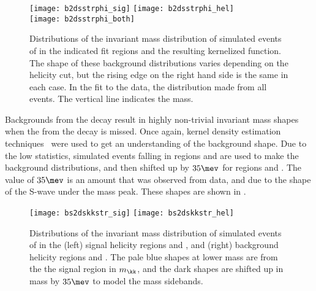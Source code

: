 \begin{figure}
  \begin{center}
    \texttt{[image: b2dsstrphi\_sig]}
    \texttt{[image: b2dsstrphi\_hel]}\\
    \texttt{[image: b2dsstrphi\_both]}
    \caption[Contribution to the \btodsphi fit from the \btodsstrphi background]
    {
      Distributions of the invariant mass distribution of simulated events of \btodsstrphi
      in the indicated fit regions and the resulting kernelized function.
      The shape of these background distributions varies depending on the helicity cut, but the
      rising edge on the right hand side is the same in each case.
      In the fit to the data, the distribution made from all events.
      The vertical line indicates the \Bp mass.
    }
    \label{fig:dsphi:dsstrphi}
  \end{center}
\end{figure}






Backgrounds from the decay \bstodskstrk result in highly non-trivial invariant mass shapes when the
\pip from the \Kstarz decay is missed.
Once again, kernel density estimation techniques~\cite{Cranmer:2000du} were used to get an
understanding of the background shape.
Due to the low statistics, simulated \bstodskstrk events falling in regions \rA and \rB are used to
make the background distributions, and then shifted up by $35\mev$ for regions \rC and \rD.
The value of $35\mev$ is an amount that was observed from data, and due to the shape of the \kk
S-wave under the \phii mass peak.
These shapes are shown in .

\begin{figure}
  \begin{center}
    \texttt{[image: bs2dskkstr\_sig]}
    \texttt{[image: bs2dskkstr\_hel]}
    \caption[Shapes of background contributions of \bstodskstrk]
    {\small
      Distributions of the invariant mass distribution of simulated events of \bstodskstrk in the
      (left) signal helicity regions \rA and \rB, and
      (right) background helicity regions \rC and \rD.
      The pale blue shapes at lower mass are from the the signal region in $m_\kk$, and the dark
      shapes are shifted up in mass by $35\mev$ to model the \phii mass sidebands.
    }
    \label{fig:dsphi:bstodskstrk}
  \end{center}
\end{figure}

